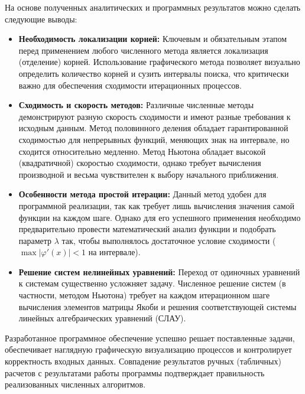 \documentclass[a4paper,12pt]{article}
\begin{document}
На основе полученных аналитических и программных результатов можно сделать следующие выводы:
\begin{itemize}
    \item \textbf{Необходимость локализации корней:} Ключевым и обязательным этапом перед применением любого численного метода является локализация (отделение) корней. Использование графического метода позволяет визуально определить количество корней и сузить интервалы поиска, что критически важно для обеспечения сходимости итерационных процессов.
    \item \textbf{Сходимость и скорость методов:} Различные численные методы демонстрируют разную скорость сходимости и имеют разные требования к исходным данным. Метод половинного деления обладает гарантированной сходимостью для непрерывных функций, меняющих знак на интервале, но сходится относительно медленно. Метод Ньютона обладает высокой (квадратичной) скоростью сходимости, однако требует вычисления производной и весьма чувствителен к выбору начального приближения.
    \item \textbf{Особенности метода простой итерации:} Данный метод удобен для программной реализации, так как требует лишь вычисления значения самой функции на каждом шаге. Однако для его успешного применения необходимо предварительно провести математический анализ функции и подобрать параметр $\lambda$ так, чтобы выполнялось достаточное условие сходимости ($\max |\varphi'(x)| < 1$ на интервале).
    \item \textbf{Решение систем нелинейных уравнений:} Переход от одиночных уравнений к системам существенно усложняет задачу. Численное решение систем (в частности, методом Ньютона) требует на каждом итерационном шаге вычисления элементов матрицы Якоби и решения соответствующей системы линейных алгебраических уравнений (СЛАУ).
\end{itemize}

Разработанное программное обеспечение успешно решает поставленные задачи, обеспечивает наглядную графическую визуализацию процессов и контролирует корректность входных данных. Совпадение результатов ручных (табличных) расчетов с результатами работы программы подтверждает правильность реализованных численных алгоритмов.
\end{document}
